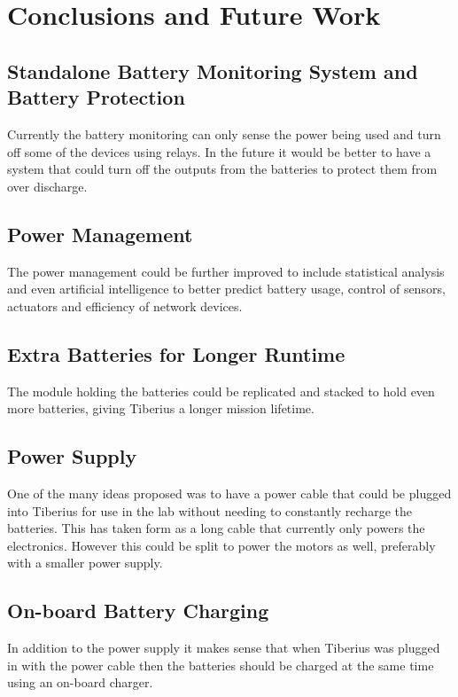 \section{Conclusions and Future Work}

\subsection{Standalone Battery Monitoring System and Battery Protection}
Currently the battery monitoring can only sense the power being used and turn off some of the devices using relays. In the future it would be better to have a system that could turn off the outputs from the batteries to protect them from over discharge.

\subsection{Power Management} The power management could be further improved to include statistical analysis and even artificial intelligence to better predict battery usage, control of sensors, actuators and efficiency of network devices.

\subsection{Extra Batteries for Longer Runtime}
The module holding the batteries could be replicated and stacked to hold even more batteries, giving Tiberius a longer mission lifetime.

\subsection{Power Supply}
One of the many ideas proposed was to have a power cable that could be plugged into Tiberius for use in the lab without needing to constantly recharge the batteries. This has taken form as a long cable that currently only powers the electronics. However this could be split to power the motors as well, preferably with a smaller power supply.

\subsection{On-board Battery Charging}
In addition to the power supply it makes sense that when Tiberius was plugged in with the power cable then the batteries should be charged at the same time using an on-board charger.